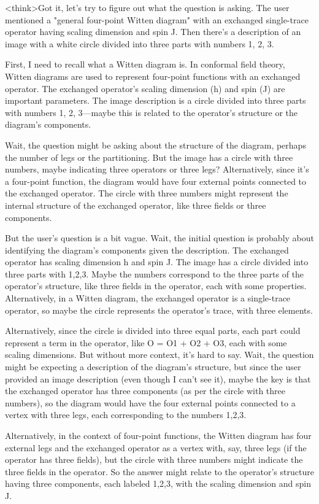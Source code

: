 <think>Got it, let's try to figure out what the question is asking. The user mentioned a "general four-point Witten diagram" with an exchanged single-trace operator having scaling dimension and spin J. Then there's a description of an image with a white circle divided into three parts with numbers 1, 2, 3. 

First, I need to recall what a Witten diagram is. In conformal field theory, Witten diagrams are used to represent four-point functions with an exchanged operator. The exchanged operator's scaling dimension (h) and spin (J) are important parameters. The image description is a circle divided into three parts with numbers 1, 2, 3—maybe this is related to the operator's structure or the diagram's components.

Wait, the question might be asking about the structure of the diagram, perhaps the number of legs or the partitioning. But the image has a circle with three numbers, maybe indicating three operators or three legs? Alternatively, since it's a four-point function, the diagram would have four external points connected to the exchanged operator. The circle with three numbers might represent the internal structure of the exchanged operator, like three fields or three components. 

But the user's question is a bit vague. Wait, the initial question is probably about identifying the diagram's components given the description. The exchanged operator has scaling dimension h and spin J. The image has a circle divided into three parts with 1,2,3. Maybe the numbers correspond to the three parts of the operator's structure, like three fields in the operator, each with some properties. Alternatively, in a Witten diagram, the exchanged operator is a single-trace operator, so maybe the circle represents the operator's trace, with three elements. 

Alternatively, since the circle is divided into three equal parts, each part could represent a term in the operator, like O = O1 + O2 + O3, each with some scaling dimensions. But without more context, it's hard to say. Wait, the question might be expecting a description of the diagram's structure, but since the user provided an image description (even though I can't see it), maybe the key is that the exchanged operator has three components (as per the circle with three numbers), so the diagram would have the four external points connected to a vertex with three legs, each corresponding to the numbers 1,2,3. 

Alternatively, in the context of four-point functions, the Witten diagram has four external legs and the exchanged operator as a vertex with, say, three legs (if the operator has three fields), but the circle with three numbers might indicate the three fields in the operator. So the answer might relate to the operator's structure having three components, each labeled 1,2,3, with the scaling dimension and spin J. 


